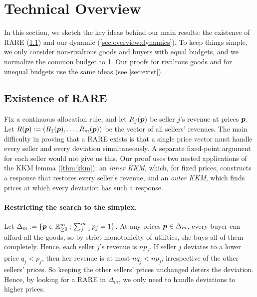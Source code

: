 \section{Technical Overview}
\label{sec:overview}

In this section, we sketch the key ideas behind our main results:
the existence of RARE (\cref{sec:overview:exist}) and our dynamic (\cref{sec:overview:dynamics}).
To keep things simple, we only consider non-rivalrous goods and buyers with equal budgets,
and we normalize the common budget to 1.
Our proofs for rivalrous goods and for unequal budgets use the same ideas (see \cref{sec:exist}).

\subsection{Existence of RARE}
\label{sec:overview:exist}

Fix a continuous allocation rule, and let $R_j(\bm{p})$ be seller $j$'s revenue at prices $\bm{p}$.
Let $R(\bm{p}) := (R_1(\bm{p}), \ldots, R_m(\bm{p}))$ be the vector of all sellers' revenues.
The main difficulty in proving that a RARE exists is that a single price vector
must handle every seller and every deviation simultaneously.
A separate fixed-point argument for each seller would not give us this.
Our proof uses two nested applications of the KKM lemma (\cref{thm:kkm}):
an \emph{inner KKM}, which, for fixed prices, constructs a response that restores every seller's revenue,
and an \emph{outer KKM}, which finds prices at which every deviation has such a response.

\paragraph{Restricting the search to the simplex.}
Let $\Delta_m := \{\bm{p} \in \mathbb{R}_{\ge 0}^m: \sum_{j=1}^m p_j = 1\}$.
At any prices $\bm{p} \in \Delta_m$, every buyer can afford all the goods,
so by strict monotonicity of utilities, she buys all of them completely.
Hence, each seller $j$'s revenue is $np_j$.
If seller $j$ deviates to a lower price $q_j < p_j$,
then her revenue is at most $nq_j < np_j$, irrespective of the other sellers' prices.
So keeping the other sellers' prices unchanged deters the deviation.
Hence, by looking for a RARE in $\Delta_m$, we only need to handle deviations to higher prices.

